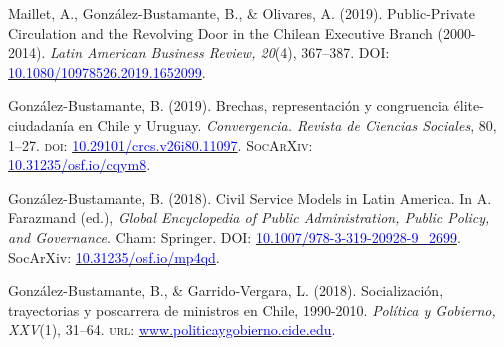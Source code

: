 \begin{publications}
\begin{benumerate}{13}
\item{Maillet, A., González-Bustamante, B., \& Olivares, A. (2019). Public-Private Circulation and the Revolving Door in the Chilean Executive Branch (2000-2014). {\itshape Latin American Business Review, 20}(4), 367--387. DOI: \href{https://doi.org/10.1080/10978526.2019.1652099}{\textcolor{blue}{10.1080/10978526.2019.1652099}}.}\vspace{1mm}

\item{González-Bustamante, B. (2019). Brechas, representación y congruencia élite-ciudadanía en Chile y Uruguay. {\itshape Convergencia. Revista de Ciencias Sociales}, 80, 1--27. {\scshape doi}: \href{https://doi.org/10.29101/crcs.v26i80.11097}{\textcolor{blue}{10.29101/crcs.v26i80.11097}}. {\scshape \footnotesize SocArXiv:} \\ \href{https://doi.org/10.31235/osf.io/cqym8}{\textcolor{blue}{10.31235/osf.io/cqym8}}.}\vspace{1mm} %

\item{González-Bustamante, B. (2018). Civil Service Models in Latin America. In A. Farazmand (ed.), {\itshape Global Encyclopedia of Public Administration, Public Policy, and Governance}. Cham: Springer. DOI: \href{https://doi.org/10.1007/978-3-319-20928-9\_2699}{\textcolor{blue}{10.1007/978-3-319-20928-9\_2699}}. SocArXiv: \href{https://doi.org/10.31235/osf.io/mp4qd}{\textcolor{blue}{10.31235/osf.io/mp4qd}}.}\vspace{1mm}

\item{González-Bustamante, B., \& Garrido-Vergara, L. (2018). Socialización, trayectorias y poscarrera de ministros en Chile, 1990-2010. {\itshape Política y Gobierno, XXV}(1), 31--64. {\scshape url:} \href{http://www.politicaygobierno.cide.edu/index.php/pyg/article/view/1080}{\textcolor{blue}{www.politicaygobierno.cide.edu}}.}\vspace{1mm}

\end{benumerate}

\end{publications}

